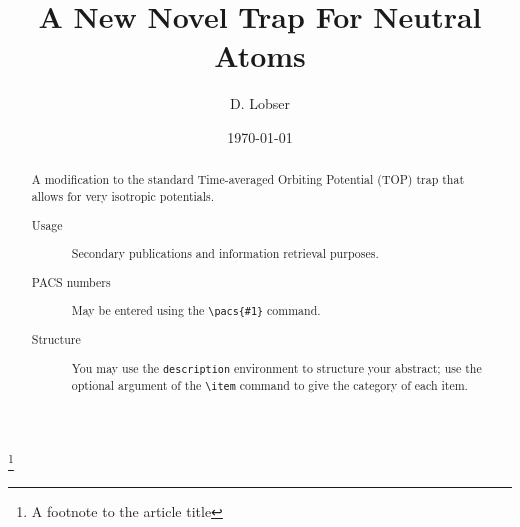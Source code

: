 \documentclass[%
 reprint,
 amsmath,amssymb,
 aps,
]{revtex4-1}
\begin{document}

\title{A New Novel Trap For Neutral Atoms}%
\thanks{A footnote to the article title}%

\author{D. Lobser}


%

\date{\today}%

\begin{abstract}
A modification to the standard Time-averaged Orbiting Potential (TOP) trap that allows for very isotropic potentials.
\begin{description}
\item[Usage]
Secondary publications and information retrieval purposes.
\item[PACS numbers]
May be entered using the \verb+\pacs{#1}+ command.
\item[Structure]
You may use the \texttt{description} environment to structure your abstract;
use the optional argument of the \verb+\item+ command to give the category of each item. 
\end{description}
\end{abstract}

\maketitle
\end{document}
